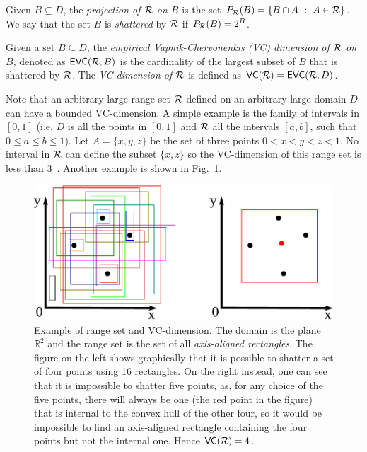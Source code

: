 Given $B\subseteq D$, the \emph{projection of $\mathcal{R}$ on $B$} is the set
$P_{\mathcal{R}}(B)=\{ B\cap A ~:~ A\in\mathcal{R}\}$. We say that the set $B$ is
\emph{shattered} by $\mathcal{R}$ if $P_{\mathcal{R}}(B)=2^B$.

\begin{definition}\label{def:empvcdim}
  Given a set $B\subseteq D$, the \emph{empirical Vapnik-Chervonenkis
  (VC) dimension of $\mathcal{R}$ on $B$}, denoted as $\mathsf{EVC}(\mathcal{R},B)$ is
  the cardinality of the largest subset of $B$ that is shattered by
  $\mathcal{R}$. The \emph{VC-dimension of $\mathcal{R}$} is defined as $\mathsf{VC}(\mathcal{R})=\mathsf{EVC}(\mathcal{R},D)$.
\end{definition}

Note that an arbitrary large range set $\mathcal{R}$ defined on an arbitrary large
domain $D$ can have a bounded VC-dimension. A simple
example is the family of intervals in $[0,1]$ (i.e. $D$ is all the points in
$[0,1]$ and $\mathcal{R}$ all the intervals $[a,b]$, such that $0\leq a\leq b\leq 1$). Let
$A=\{x,y,z\}$ be the set of three points $0<x<y<z<1$. No interval in $\mathcal{R}$ can
define the subset $\{x,z\}$ so the VC-dimension of this range set is less than
3~\cite[Lemma 10.3.1]{Matousek02}. Another example is shown in
Fig.~\ref{fig:rectangles}.
\begin{figure}[ht]
  \centering
  \includegraphics[width=.7\textwidth,keepaspectratio]{rectangles}
  \caption{Example of range set and VC-dimension. The domain is the
  plane $\mathbb{R}^2$ and the range set is the set of all
  \emph{axis-aligned rectangles}. The figure on the left shows graphically that
  it is possible to shatter a set of four points using 16 rectangles. On the
  right instead, one can see that it is impossible to shatter five points, as,
  for any choice of the five points, there will always be one (the red point in
  the figure) that is internal to the convex hull of the other four, so it would
  be impossible to find an axis-aligned rectangle containing the four points
  but not the internal one. Hence $\mathsf{VC}(\mathcal{R})=4$.
  }
  \label{fig:rectangles}
\end{figure}

